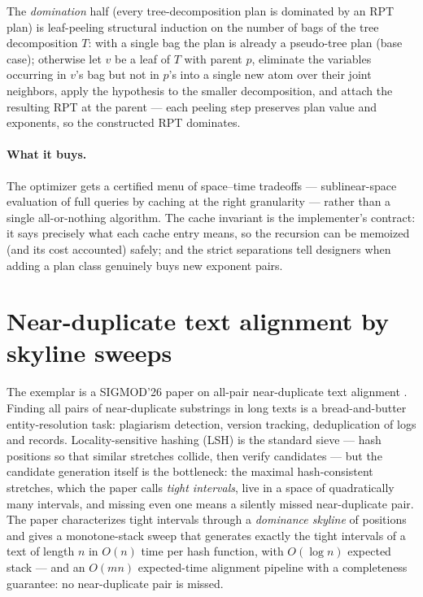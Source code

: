 The \emph{domination} half (every tree-decomposition plan is dominated by an RPT plan)
is leaf-peeling structural induction on the number of bags of the tree decomposition
$T$: with a single bag the plan is already a pseudo-tree plan (base case); otherwise
let $v$ be a leaf of $T$ with parent $p$, eliminate the variables occurring in $v$'s
bag but not in $p$'s into a single new atom over their joint neighbors, apply the
hypothesis to the smaller decomposition, and attach the resulting RPT at the parent ---
each peeling step preserves plan value and exponents, so the constructed RPT dominates.

\paragraph{What it buys.}
The optimizer gets a certified menu of space--time tradeoffs --- sublinear-space
evaluation of full queries by caching at the right granularity --- rather than a single
all-or-nothing algorithm. The cache invariant is the implementer's contract: it says
precisely what each cache entry means, so the recursion can be memoized (and its cost
accounted) safely; and the strict separations tell designers when adding a plan class
genuinely buys new exponent pairs.

\section{Near-duplicate text alignment by skyline sweeps}
\label{sec:ind-lsh}

The exemplar is a SIGMOD'26 paper on all-pair near-duplicate text alignment
\citep{sigmod26-153}. Finding all pairs of near-duplicate substrings in long texts is
a bread-and-butter entity-resolution task: plagiarism detection, version tracking,
deduplication of logs and records. Locality-sensitive hashing (LSH) is the standard
sieve --- hash positions so that similar stretches collide, then verify candidates ---
but the candidate generation itself is the bottleneck: the maximal hash-consistent
stretches, which the paper calls \emph{tight intervals}, live in a space of
quadratically many intervals, and missing even one means a silently missed
near-duplicate pair. The paper characterizes tight intervals through a
\emph{dominance skyline} of positions and gives a monotone-stack sweep that generates
exactly the tight intervals of a text of length $n$ in $O(n)$ time per hash function,
with $O(\log n)$ expected stack --- and an $O(mn)$ expected-time alignment pipeline
with a completeness guarantee: no near-duplicate pair is missed.

